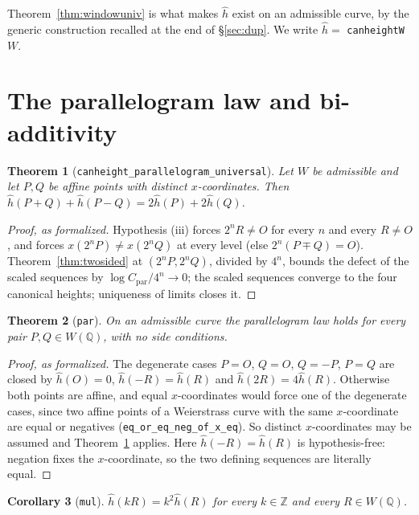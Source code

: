 \documentclass[11pt,reqno]{amsart}
\theoremstyle{plain}
\newtheorem{theorem}{Theorem}[section]
\newtheorem{corollary}[theorem]{Corollary}
\theoremstyle{definition}
\theoremstyle{remark}
\DeclareRobustCommand{\lt}[1]{\texttt{#1}}
\newcommand{\hh}{\widehat{h}}
\begin{document}
Theorem~\ref{thm:windowuniv} is what makes $\hh$ exist on an admissible
curve, by the generic construction recalled at the end of
\S\ref{sec:dup}. We write $\hh = $ \lt{canheightW} $W$.

\section{The parallelogram law and bi-additivity}\label{sec:par}

\begin{theorem}[\lt{canheight\_parallelogram\_universal}]\label{thm:parx}
Let $W$ be admissible and let $P,Q$ be affine points with distinct
$x$-coordinates. Then
$\hh(P{+}Q) + \hh(P{-}Q) = 2\hh(P) + 2\hh(Q)$.
\end{theorem}

\begin{proof}[Proof, as formalized]
Hypothesis (iii) forces $2^nR \ne O$ for every $n$ and every $R \ne O$,
and forces $x(2^nP) \ne x(2^nQ)$ at every level (else $2^n(P \mp Q) =
O$). Theorem~\ref{thm:twosided} at $(2^nP, 2^nQ)$, divided by $4^n$,
bounds the defect of the scaled sequences by $\log
C_{\mathrm{par}}/4^n \to 0$; the scaled sequences converge to the four
canonical heights; uniqueness of limits closes it.
\end{proof}

\begin{theorem}[\lt{par}]\label{thm:parall}
On an admissible curve the parallelogram law holds for \emph{every} pair
$P,Q \in W(\mathbb{Q})$, with no side conditions.
\end{theorem}

\begin{proof}[Proof, as formalized]
The degenerate cases $P = O$, $Q = O$, $Q = -P$, $P = Q$ are closed by
$\hh(O) = 0$, $\hh(-R) = \hh(R)$ and $\hh(2R) = 4\hh(R)$. Otherwise both
points are affine, and equal $x$-coordinates would force one of the
degenerate cases, since two affine points of a Weierstrass curve with
the same $x$-coordinate are equal or negatives
(\lt{eq\_or\_eq\_neg\_of\_x\_eq}). So distinct $x$-coordinates may be
assumed and Theorem~\ref{thm:parx} applies. Here $\hh(-R) = \hh(R)$ is
hypothesis-free: negation fixes the $x$-coordinate, so the two defining
sequences are literally equal.
\end{proof}

\begin{corollary}[\lt{mul}]\label{cor:mult}
$\hh(kR) = k^2\hh(R)$ for every $k \in \mathbb{Z}$ and every
$R \in W(\mathbb{Q})$.
\end{corollary}
\end{document}
